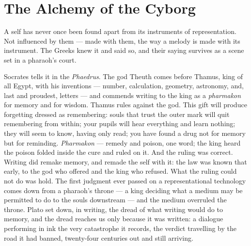 \hypertarget{fer1-the-alchemy-of-the-cyborg}{%
\chapter{The Alchemy of the Cyborg}\label{fer1-the-alchemy-of-the-cyborg}\label{ch:new-logic}}

A self has never once been found apart from its instruments of
representation. Not influenced by them --- made with them, the way a
melody is made with its instrument. The Greeks knew it and said so, and
their saying survives as a scene set in a pharaoh's court.

Socrates tells it in the \emph{Phaedrus}. The god Theuth comes before
Thamus, king of all Egypt, with his inventions --- number, calculation,
geometry, astronomy, and, last and proudest, letters --- and commends
writing to the king as a \emph{pharmakon} for memory and for wisdom.
Thamus rules against the god. This gift will produce forgetting dressed
as remembering: souls that trust the outer mark will quit remembering
from within; your pupils will hear everything and learn nothing; they
will seem to know, having only read; you have found a drug not for
memory but for reminding. \emph{Pharmakon} --- remedy and poison, one
word; the king heard the poison folded inside the cure and ruled on it.
And the ruling was correct. Writing did remake memory, and remade the
self with it: the law was known that early, to the god who offered
and the king who refused. What the ruling could not do was hold. The
first judgment ever passed on a representational technology comes down
from a pharaoh's throne --- a king deciding what a medium may be
permitted to do to the souls downstream --- and the medium overruled the
throne. Plato set down, in writing, the dread of what writing would do
to memory, and the dread reaches us only because it was written: a
dialogue performing in ink the very catastrophe it records, the verdict
travelling by the road it had banned, twenty-four centuries out and
still arriving.

